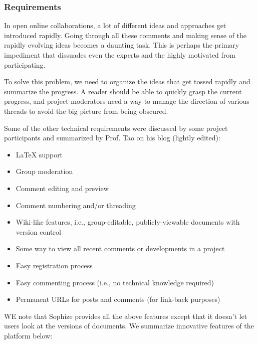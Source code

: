 \documentclass[a4paper]{article}
\begin{document}
\subsubsection*{Requirements}

In open online collaborations, a lot of different ideas and approaches get introduced rapidly. Going through all these comments and making sense of the rapidly evolving ideas becomes a daunting task. This is perhaps the primary impediment that dissuades even the experts and the highly motivated from participating.


To solve this problem, we need to organize the ideas that get tossed rapidly and summarize the progress. A reader should be able to quickly grasp the current progress, and project moderators need a way to manage the direction of various threads to avoid the big picture from being obscured.


Some of the other technical requirements were discussed by some project participants and summarized by Prof. Tao on his blog (lightly edited):

\begin{itemize}

  \item LaTeX support

  \item Group moderation

  \item Comment editing and preview

  \item Comment numbering and/or threading

  \item Wiki-like features, i.e., group-editable, publicly-viewable documents with version control

  \item Some way to view all recent comments or developments in a project

  \item Easy registration process

  \item Easy commenting process (i.e., no technical knowledge required)

  \item Permanent URLs for posts and comments (for link-back purposes)

\end{itemize}


WE note that Sophize provides all the above features except that it doesn't let users look at the versions of documents. We summarize innovative features of the platform below:
\end{document}
